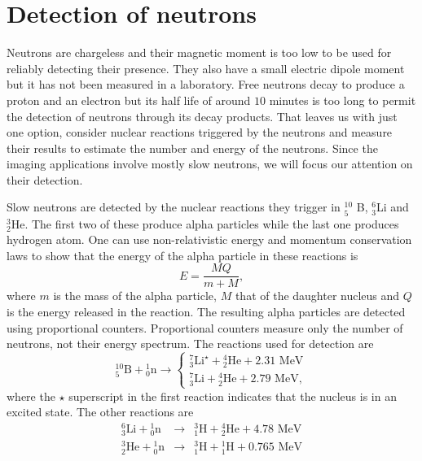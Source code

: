 \documentclass{article}
\numberwithin{equation}{section}
\begin{document}
\section{Detection of neutrons}\label{s5}
Neutrons are chargeless and their magnetic moment is too low to be used for
reliably detecting their presence. They also have a small electric dipole 
moment but it has not been measured in a laboratory. Free neutrons decay to
produce a proton and an electron but its half life of around $10$ minutes is
too long to permit the detection of neutrons through its decay products. That
leaves us with just one option, consider nuclear reactions triggered by the
neutrons and measure their results to estimate the number and energy of the
neutrons. Since the imaging applications involve mostly slow neutrons, we will
focus our attention on their detection. 

Slow neutrons are detected by the nuclear reactions they trigger in ${}^{10}_5$
B, ${}^6_3$Li and ${}^3_2$He. The first two of these produce alpha particles
while the last one produces hydrogen atom. One can use non-relativistic energy
and momentum conservation laws to show that the energy of the alpha particle
in these reactions is \cite{turner2008atoms}
\begin{equation}\label{s5e1}
E = \frac{MQ}{m + M},
\end{equation}
where $m$ is the mass of the alpha particle, $M$ that of the daughter 
nucleus and $Q$ is the energy released in the reaction. The resulting alpha
particles are detected using proportional counters. Proportional counters
measure only the number of neutrons, not their energy spectrum. The reactions
used for detection are \cite{crane1991neutron}
\begin{equation}\label{s5e2}
{}^{10}_5\text{B}+{}^1_0\text{n} \rightarrow \begin{cases}
{}^7_3\text{Li}^\star + {}^4_2\text{He} + 2.31\text{ MeV} \\
{}^7_3\text{Li} + {}^4_2\text{He} + 2.79\text{ MeV}, 
\end{cases}
\end{equation}
where the $\star$ superscript in the first reaction indicates that the nucleus
is in an excited state. The other reactions are
\begin{eqnarray}
{}^6_3\text{Li}+{}^1_0\text{n}&\rightarrow&{}^3_1\text{H} + {}^4_2\text{He} +
4.78\text{ MeV} \label{s5e3} \\
{}^3_2\text{He}+{}^1_0\text{n}&\rightarrow&{}^3_1\text{H} + {}^1_1\text{H} +
0.765\text{ MeV} \label{s5e4} 
\end{eqnarray}
\end{document}
